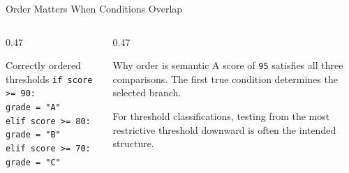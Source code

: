 \documentclass[aspectratio=169,10pt]{beamer}
\begin{document}
\begin{frame}{Order Matters When Conditions Overlap}
  \begin{columns}[T,onlytextwidth]
    \begin{column}{0.47\textwidth}
      \begin{block}{Correctly ordered thresholds}
        \texttt{if score >= 90:}\\
        \hspace*{0.16in}\texttt{grade = "A"}\\
        \texttt{elif score >= 80:}\\
        \hspace*{0.16in}\texttt{grade = "B"}\\
        \texttt{elif score >= 70:}\\
        \hspace*{0.16in}\texttt{grade = "C"}
      \end{block}
    \end{column}

    \begin{column}{0.47\textwidth}
      \begin{alertblock}{Why order is semantic}
        A score of \texttt{95} satisfies all three comparisons. The first true condition determines the selected branch.
      \end{alertblock}

      For threshold classifications, testing from the most restrictive threshold downward is often the intended structure.
    \end{column}
  \end{columns}
\end{frame}
\end{document}
